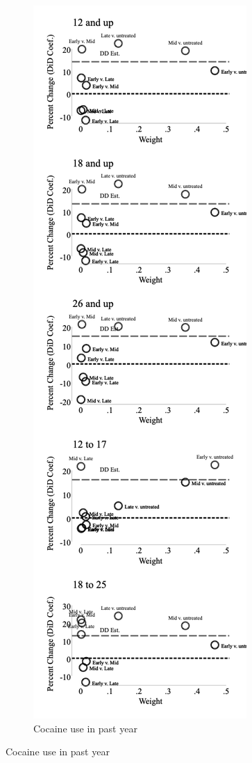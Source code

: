 \documentclass[12pt]{article}%
\begin{document}
\begin{figure}
\begin{minipage}{.9\linewidth}
\begin{subfigure}[b]{0.32\columnwidth}
    \label{fig:bacon_lead_lag_tob_30}
  \end{subfigure}
   \hfill %
  \begin{subfigure}[b]{0.32\columnwidth}
    \caption{\scriptsize{Cocaine use in past year}}
    \includegraphics[width=\linewidth]{../output/plots/bacon_weights_ln_coke_use_365.png}

\end{subfigure}
\end{minipage}
\end{figure}
\end{document}
